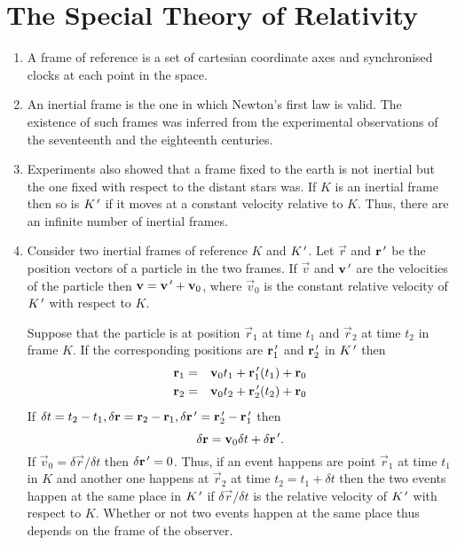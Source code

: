\chapter{The Special Theory of Relativity}\label{c1}
\begin{enumerate}
\item A frame of reference is a set of cartesian coordinate axes and 
synchronised clocks at each point in the space.

\item An inertial frame is the one in which Newton's first law is valid. The 
existence of such frames was inferred from the experimental observations of the
seventeenth and the eighteenth centuries.

\item Experiments also showed that a frame fixed to the earth is not inertial
but the one fixed with respect to the distant stars was. If $K$ is an inertial
frame then so is $K^{\,\prime}$ if it moves at a constant velocity relative
to $K$. Thus, there are an infinite number of inertial frames.

\item Consider two inertial frames of reference $K$ and $K^{\,\prime}$. Let $\vec{r}$
and $\mathbf{r}^{\,\prime}$ be the position vectors of a particle in the two frames. If 
$\vec{v}$ and $\mathbf{v}^{\,\prime}$ are the velocities of the particle then $\mathbf{v} =
\mathbf{v}^{\,\prime} + \mathbf{v}_0$, where $\vec{v}_0$ is the constant relative velocity
of $K^{\,\prime}$ with respect to $K$.

Suppose that the particle is at position $\vec{r}_1$ at time $t_1$ and 
$\vec{r}_2$ at time $t_2$ in frame $K$. If the corresponding positions are
$\mathbf{r}_1^{\,\prime}$ and $\mathbf{r}_2^{\,\prime}$ in $K^{\,\prime}$ then
\begin{eqnarray*}
\mathbf{r}_1 &=& \mathbf{v}_0t_1 + \mathbf{r}_1^{\,\prime}(t_1) + \mathbf{r}_0 \\
\mathbf{r}_2 &=& \mathbf{v}_0t_2 + \mathbf{r}_2^{\,\prime}(t_2) + \mathbf{r}_0
\end{eqnarray*}
If $\delta t = t_2 - t_1, \delta\mathbf{r} = \mathbf{r}_2 - \mathbf{r}_1, 
\delta\mathbf{r}^{\,\prime} = \mathbf{r}_2^{\,\prime} - \mathbf{r}_1^{\,\prime}$ then
\[
\delta\mathbf{r} = \mathbf{v}_0\delta t + \delta\mathbf{r}^{\,\prime}.
\]
If $\vec{v}_0 = \delta\vec{r}/\delta t$ then $\delta\mathbf{r}^{\,\prime} = 0$. Thus, if
an event happens are point $\vec{r}_1$ at time $t_1$ in $K$ and another one
happens at $\vec{r}_2$ at time $t_2 = t_1 + \delta t$ then the two events 
happen at the same place in $K^{\,\prime}$ if $\delta\vec{r}/\delta t$ is the relative
velocity of $K^{\,\prime}$ with respect to $K$. Whether or not two events happen at
the same place thus depends on the frame of the observer.


\end{enumerate}
